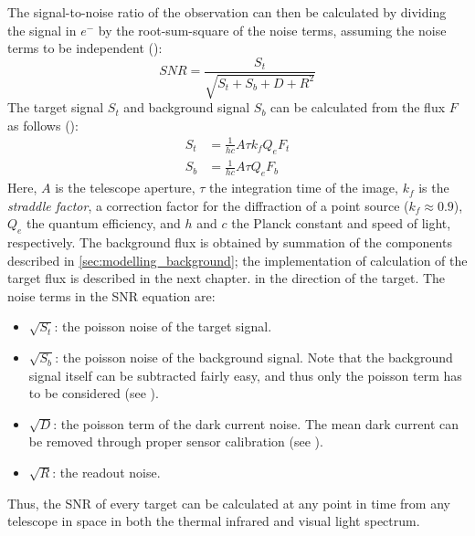 The signal-to-noise ratio of the observation can then be calculated by dividing the signal in $e^-$ by the root-sum-square of the noise terms, assuming the noise terms to be independent (\cite{DetectionAndTracking}):
\begin{equation}
 SNR = \frac{S_t}{\sqrt{S_t + S_b + D + R^2}}
\end{equation}
The target signal $S_t$ and background signal $S_b$ can be calculated from the flux $F$ as follows (\cite{DetectionAndTracking}):
\begin{align}
 S_t &= \frac{1}{hc}A \tau k_f Q_e F_t \\
 S_b &= \frac{1}{hc}A \tau Q_e F_b
\end{align}
Here, $A$ is the telescope aperture, $\tau$ the integration time of the image, $k_f$ is the \textit{straddle factor}, a correction factor for the diffraction of a point source ($k_f \approx 0.9$), $Q_e$ the quantum efficiency, and $h$ and $c$ the Planck constant and speed of light, respectively. The background flux is obtained by summation of the components described in \autoref{sec:modelling_background}; the implementation of calculation of the target flux is described in the next chapter. in the direction of the target. The noise terms in the SNR equation are:
\begin{itemize}
 \item $\sqrt{S_t}$: the poisson noise of the target signal.
 \item $\sqrt{S_b}$: the poisson noise of the background signal. Note that the background signal itself can be subtracted fairly easy, and thus only the poisson term has to be considered (see \cite{StarRemoval}).
 \item $\sqrt{D}$: the poisson term of the dark current noise. The mean dark current can be removed through proper sensor calibration (see \cite{OpNav}).
 \item $\sqrt{R}$: the readout noise.
\end{itemize}

Thus, the SNR of every target can be calculated at any point in time from any telescope in space in both the thermal infrared and visual light spectrum.

